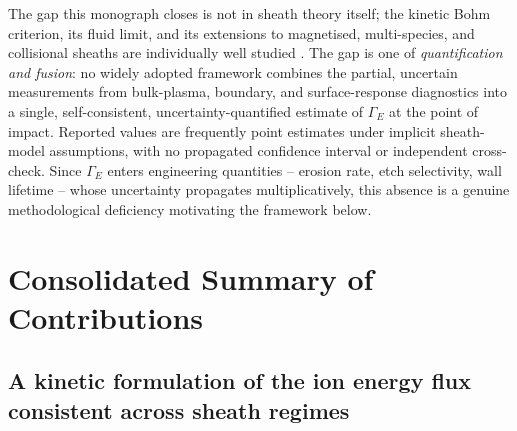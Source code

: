 The gap this monograph closes is not in sheath theory itself; the kinetic Bohm criterion, its fluid limit, and its extensions to magnetised, multi-species, and collisional sheaths are individually well studied \cite{ref0001,ref0013,ref0017}. The gap is one of \emph{quantification and fusion}: no widely adopted framework combines the partial, uncertain measurements from bulk-plasma, boundary, and surface-response diagnostics into a single, self-consistent, uncertainty-quantified estimate of $\Gamma_{E}$ at the point of impact. Reported values are frequently point estimates under implicit sheath-model assumptions, with no propagated confidence interval or independent cross-check. Since $\Gamma_{E}$ enters engineering quantities -- erosion rate, etch selectivity, wall lifetime -- whose uncertainty propagates multiplicatively, this absence is a genuine methodological deficiency motivating the framework below.

\section{Consolidated Summary of Contributions}
\label{sec:conclusion-summary}

\subsection{A kinetic formulation of the ion energy flux consistent across sheath regimes}
\label{ssec:conclusion-kinetic}


